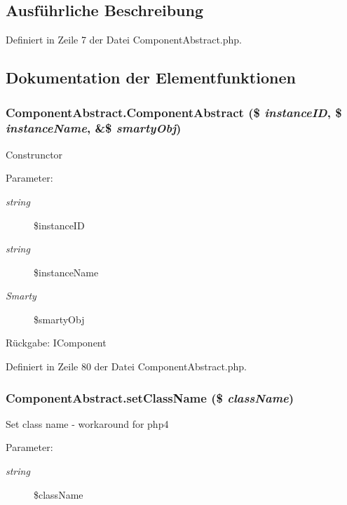 \subsection{Ausführliche Beschreibung}


Definiert in Zeile 7 der Datei ComponentAbstract.php.

\subsection{Dokumentation der Elementfunktionen}
\subsubsection{\setlength{\rightskip}{0pt plus 5cm}ComponentAbstract.ComponentAbstract (\$ {\em instanceID}, \$ {\em instanceName}, \&\$ {\em smartyObj})}\label{classComponentAbstract_ad4bd12fec470997357118135d8ea17d}


Construnctor

\begin{Desc}
\item[Parameter:]
\begin{description}
\item[{\em string}]\$instanceID \item[{\em string}]\$instanceName \item[{\em Smarty}]\$smartyObj \end{description}
\end{Desc}
\begin{Desc}
\item[Rückgabe:]IComponent \end{Desc}


Definiert in Zeile 80 der Datei ComponentAbstract.php.
\subsubsection{\setlength{\rightskip}{0pt plus 5cm}ComponentAbstract.setClassName (\$ {\em className})}\label{classComponentAbstract_b22de345ea6ddc4473566830a4f3d11f}


Set class name - workaround for php4

\begin{Desc}
\item[Parameter:]
\begin{description}
\item[{\em string}]\$className \end{description}
\end{Desc}


